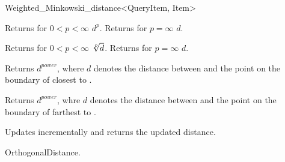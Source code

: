 \begin{ccRefClass}{Weighted_Minkowski_distance<QueryItem, Item>}

 {Returns for $0 < p <\infty$ $d^p$. Returns for $p=\infty$ $d$.}

 {Returns for $0 < p <\infty$ $\root p\of{d}$. Returns for $p=\infty$ $d$.}
 

{Returns $d^{power}$, where $d$ denotes the distance between  and
the point on the boundary of  closest to .}

{Returns $d^{power}$, whre $d$ denotes the distance between  and
the point on the boundary of  farthest to .}

 {Updates  incrementally
and returns the updated distance.}


\ccSeeAlso

OrthogonalDistance.

\end{ccRefClass}


